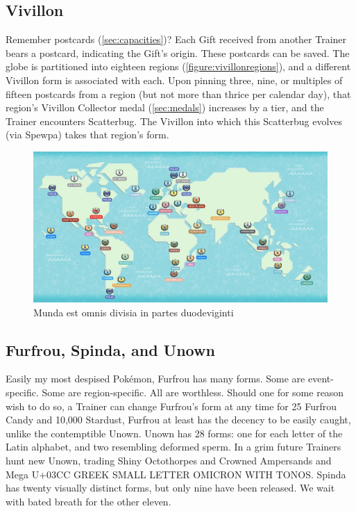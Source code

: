 \subsection{Vivillon\label{subsec:vivillon}}
Remember postcards (\autoref{sec:capacities})?
Each Gift received from another Trainer bears a postcard, indicating the Gift's origin.
These postcards can be saved.
The globe is partitioned into eighteen regions (\autoref{figure:vivillonregions}),
  and a different Vivillon form is associated with each.
Upon pinning three, nine, or multiples of fifteen postcards from a region (but not more than thrice per calendar day),
  that region's Vivillon Collector medal (\autoref{sec:medals}) increases
  by a tier, and the Trainer encounters Scatterbug.
The Vivillon into which this Scatterbug evolves (via Spewpa) takes that region's form.
\begin{figure}
\centering
\includegraphics[keepaspectratio,width=\textwidth]{images/vivillonregions.png}
\caption{Munda est omnis divisia in partes duodeviginti\label{figure:vivillonregions}}
\end{figure}

\subsection{Furfrou, Spinda, and Unown\label{subsec:furfrou}}
Easily my most despised Pokémon, Furfrou has many forms.
Some are event-specific.
Some are region-specific.
All are worthless.
Should one for some reason wish to do so, a Trainer can change Furfrou's form
  at any time for 25 Furfrou Candy and 10,000 Stardust,
Furfrou at least has the decency to be easily caught, unlike the contemptible Unown.
Unown has 28 forms: one for each letter of the Latin alphabet, and two
  resembling deformed sperm.
In a grim future Trainers hunt new Unown, trading Shiny Octothorpes and
  Crowned Ampersands and Mega U+03CC GREEK SMALL LETTER OMICRON WITH TONOS.
Spinda has twenty visually distinct forms, but only nine have been released.
We wait with bated breath for the other eleven.

